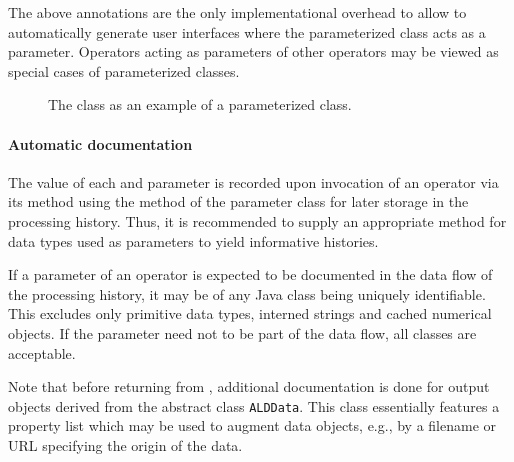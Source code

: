 The above annotations are
the only implementational overhead to allow \alida to automatically generate user interfaces where the parameterized class acts as a parameter.
Operators acting as parameters of other operators may be viewed as
special cases of parameterized classes.


\begin{figure}

\caption{\label{exa:parametrizedClass}The class  as an example of a parameterized class.}
\end{figure}

\paragraph{Automatic documentation}

The value of each  and  parameter is recorded
upon invocation of an operator via its  method using the method 
of the parameter class for later storage in the processing history.
Thus, it is recommended to supply an appropriate 
method for data types used as parameters to yield informative histories.

If a parameter of an operator is expected to be documented in the data flow of
the processing history, it
may be of any Java class being uniquely
identifiable. This excludes only primitive data types, interned strings
and cached numerical objects.
If the parameter need not to be part of the data flow, all classes are
acceptable.

Note that before returning from , additional documentation is
done for output objects derived from the abstract class \texttt{ALDData}.
This class essentially features a property list which may 
be used to augment data objects, e.g., by a filename or URL specifying 
the origin of the data.
